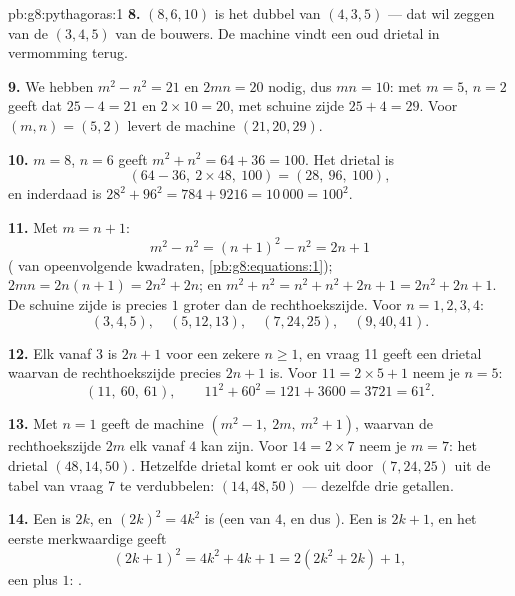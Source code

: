 \begin{solution}{pb:g8:pythagoras:1}
\textbf{8.} $(8, 6, 10)$ is het dubbel van $(4, 3, 5)$ --- dat wil zeggen van de
$(3, 4, 5)$ van de bouwers. De machine vindt  een oud drietal in vermomming
terug.

\textbf{9.} We hebben $m^2 - n^2 = 21$ en $2mn = 20$ nodig, dus $mn = 10$: met
$m = 5$, $n = 2$ geeft dat $25 - 4 = 21$ en $2 \times 10 = 20$, met schuine zijde
$25 + 4 = 29$. Voor $(m, n) = (5, 2)$ levert de machine $(21, 20, 29)$.

\textbf{10.} $m = 8$, $n = 6$ geeft $m^2 + n^2 = 64 + 36 = 100$. Het drietal is
\[
\left(64 - 36,\ 2 \times 48,\ 100\right) = (28,\ 96,\ 100),
\]
en inderdaad is $28^2 + 96^2 = 784 + 9216 = 10\,000 = 100^2$.

\textbf{11.} Met $m = n + 1$:
\[
m^2 - n^2 = (n + 1)^2 - n^2 = 2n + 1
\]
( van opeenvolgende kwadraten, \cref{pb:g8:equations:1});
$2mn = 2n(n + 1) = 2n^2 + 2n$; en
$m^2 + n^2 = n^2 + n^2 + 2n + 1 = 2n^2 + 2n + 1$. De schuine zijde is precies
$1$ groter dan de  rechthoekszijde. Voor $n = 1, 2, 3, 4$:
\[
(3, 4, 5), \quad (5, 12, 13), \quad (7, 24, 25), \quad
(9, 40, 41) .
\]

\textbf{12.} Elk  vanaf $3$ is $2n + 1$ voor een zekere $n \geq 1$,
en vraag 11 geeft een drietal waarvan de  rechthoekszijde precies $2n + 1$
is. Voor $11 = 2 \times 5 + 1$ neem je $n = 5$:
\[
(11,\ 60,\ 61),
\qquad
11^2 + 60^2 = 121 + 3600 = 3721 = 61^2 .
\]

\textbf{13.} Met $n = 1$ geeft de machine
$\left(m^2 - 1,\ 2m,\ m^2 + 1\right)$, waarvan de  rechthoekszijde $2m$ elk
 vanaf $4$ kan zijn. Voor $14 = 2 \times 7$ neem je $m = 7$: het
drietal $(48, 14, 50)$. Hetzelfde drietal komt er ook uit door $(7, 24, 25)$ uit
de tabel van vraag 7 te verdubbelen: $(14, 48, 50)$ --- dezelfde drie getallen.

\textbf{14.} Een  is $2k$, en $(2k)^2 = 4k^2$ is  (een  van
$4$, en dus ). Een  is $2k + 1$, en het eerste merkwaardige
 geeft
\[
(2k + 1)^2 = 4k^2 + 4k + 1 = 2\left(2k^2 + 2k\right) + 1 ,
\]
een  plus $1$: .


\end{solution}
